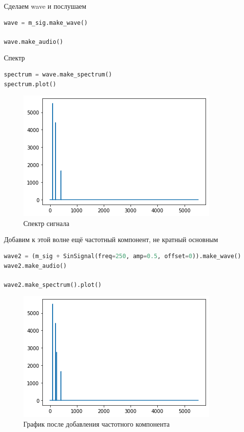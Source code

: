 Сделаем wave и послушаем
\begin{lstlisting}[language=Python]
wave = m_sig.make_wave()

wave.make_audio()
\end{lstlisting}

Спектр
\begin{lstlisting}[language=Python]
spectrum = wave.make_spectrum()
spectrum.plot()
\end{lstlisting}

\begin{figure}[H]
	\begin{center}
		\includegraphics[scale=1]{fig/lab01/lab01_09.png}
		\caption{Спектр сигнала}
	\end{center}
\end{figure}

Добавим к этой волне ещё частотный компонент, не кратный основным
\begin{lstlisting}[language=Python]
wave2 = (m_sig + SinSignal(freq=250, amp=0.5, offset=0)).make_wave()
wave2.make_audio()

wave2.make_spectrum().plot()
\end{lstlisting}

\begin{figure}[H]
	\begin{center}
		\includegraphics[scale=1]{fig/lab01/lab01_10.png}
		\caption{График после добавления частотного компонента}
	\end{center}
\end{figure}

